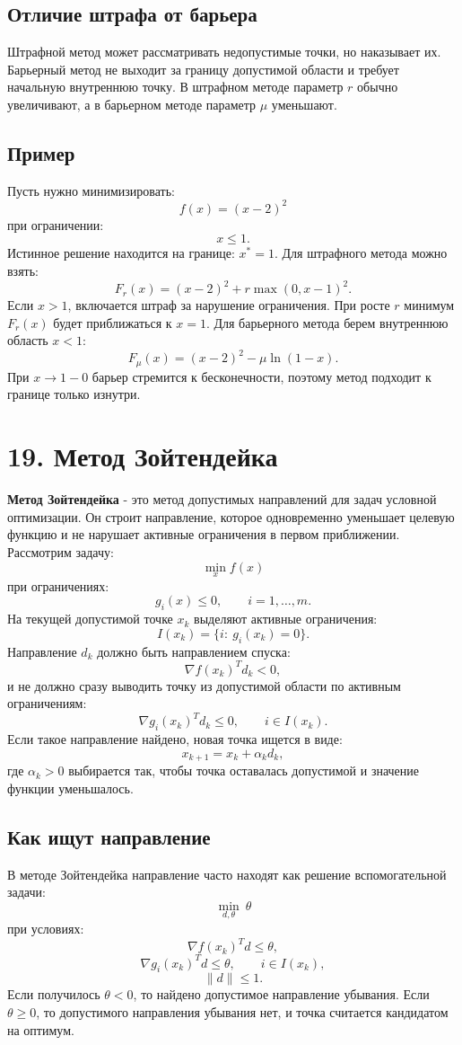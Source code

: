 \documentclass[12pt,a4paper]{article}
\begin{document}
\subsection{Отличие штрафа от барьера}
Штрафной метод может рассматривать недопустимые точки, но наказывает их.
Барьерный метод не выходит за границу допустимой области и требует начальную внутреннюю точку.
В штрафном методе параметр $r$ обычно увеличивают, а в барьерном методе параметр $\mu$ уменьшают.
\subsection{Пример}
Пусть нужно минимизировать:
\[
f(x)=(x-2)^2
\]
при ограничении:
\[
x\le 1.
\]
Истинное решение находится на границе: $x^*=1$.
Для штрафного метода можно взять:
\[
F_r(x)=(x-2)^2+r\max(0,x-1)^2.
\]
Если $x>1$, включается штраф за нарушение ограничения. При росте $r$ минимум $F_r(x)$ будет приближаться к $x=1$.
Для барьерного метода берем внутреннюю область $x<1$:
\[
F_\mu(x)=(x-2)^2-\mu\ln(1-x).
\]
При $x\to 1-0$ барьер стремится к бесконечности, поэтому метод подходит к границе только изнутри.

\section{19. Метод Зойтендейка}
\textbf{Метод Зойтендейка} - это метод допустимых направлений для задач условной оптимизации. Он строит направление, которое одновременно уменьшает целевую функцию и не нарушает активные ограничения в первом приближении.
Рассмотрим задачу:
\[
\min_x f(x)
\]
при ограничениях:
\[
g_i(x)\le 0,\qquad i=1,\ldots,m.
\]
На текущей допустимой точке $x_k$ выделяют активные ограничения:
\[
I(x_k)=\{i:\ g_i(x_k)=0\}.
\]
Направление $d_k$ должно быть направлением спуска:
\[
\nabla f(x_k)^T d_k<0,
\]
и не должно сразу выводить точку из допустимой области по активным ограничениям:
\[
\nabla g_i(x_k)^Td_k\le 0,\qquad i\in I(x_k).
\]
Если такое направление найдено, новая точка ищется в виде:
\[
x_{k+1}=x_k+\alpha_k d_k,
\]
где $\alpha_k>0$ выбирается так, чтобы точка оставалась допустимой и значение функции уменьшалось.
\subsection{Как ищут направление}
В методе Зойтендейка направление часто находят как решение вспомогательной задачи:
\[
\min_{d,\theta}\ \theta
\]
при условиях:
\[
\nabla f(x_k)^Td\le \theta,
\]
\[
\nabla g_i(x_k)^Td\le \theta,\qquad i\in I(x_k),
\]
\[
\|d\|\le 1.
\]
Если получилось $\theta<0$, то найдено допустимое направление убывания. Если $\theta\ge 0$, то допустимого направления убывания нет, и точка считается кандидатом на оптимум.
\end{document}
